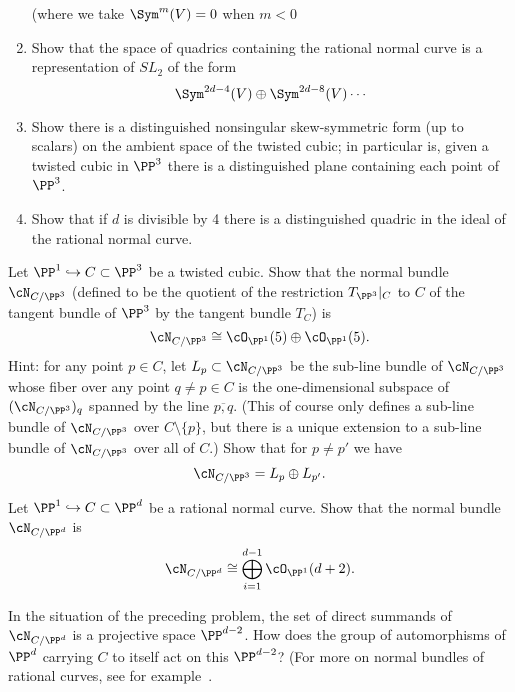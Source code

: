 \begin{exercise}
\begin{enumerate}
  (where we take $\Sym^{m}(V)=0$ when $m<0$
 \item Show that the space of quadrics containing the rational normal curve is a representation of $SL_2$ of the form
 $$
 \Sym^{2d-4}(V)\oplus \Sym^{2d-8}(V) \cdots
 $$
  \item Show  there is a distinguished nonsingular skew-symmetric form (up to scalars) on the ambient space of the twisted cubic; in particular
  is, given a twisted cubic in $\PP^3$ there is a distinguished plane containing each point of $\PP^3$.
 \item Show that if $d$ is divisible by 4 there is a distinguished quadric in the ideal of the rational normal curve.
\end{enumerate}
\end{exercise}


\begin{exercise}\label{Normal bundle of cubic}
Let $\PP^1 \hookrightarrow C \subset \PP^3$ be a twisted cubic. Show that the normal bundle $\cN_{C/\PP^3}$ (defined to be the quotient of the restriction $T_{\PP^3}|_C$ to $C$ of the tangent bundle  of $\PP^3$  by the tangent bundle $T_C$) is 
$$
\cN_{C/\PP^3} \cong \cO_{\PP^1}(5) \oplus  \cO_{\PP^1}(5).
$$
Hint: for any point $p \in C$, let $L_p \subset \cN_{C/\PP^3}$ be the sub-line bundle of $\cN_{C/\PP^3}$ whose fiber over any point $q \neq p \in C$ is the one-dimensional subspace of $(\cN_{C/\PP^3})_q$ spanned by the line $\overline{p,q}$. (This of course only defines a sub-line bundle of $\cN_{C/\PP^3}$ over $C \setminus \{p\}$, but there is a unique extension to a sub-line bundle of $\cN_{C/\PP^3}$ over all of $C$.) Show that for $p \neq p'$ we have
$$
\cN_{C/\PP^3} = L_p \oplus L_{p'}.
$$
\end{exercise}

\begin{exercise}
Let $\PP^1 \hookrightarrow C \subset \PP^d$ be a rational normal curve. Show that the normal bundle $\cN_{C/\PP^d}$  is 
$$
\cN_{C/\PP^d} \cong \bigoplus_{i=1}^{d-1} \cO_{\PP^1}(d+2).
$$
\end{exercise}

\begin{exercise}
In the situation of the preceding problem, the set  of direct summands of $\cN_{C/\PP^d} $ is a projective space $\PP^{d-2}$. How does the  group of automorphisms of $\PP^d$ carrying $C$ to itself act on this $\PP^{d-2}$?
(For more on normal bundles of rational curves, see for example~\cite{MR3778979}.
\end{exercise}




